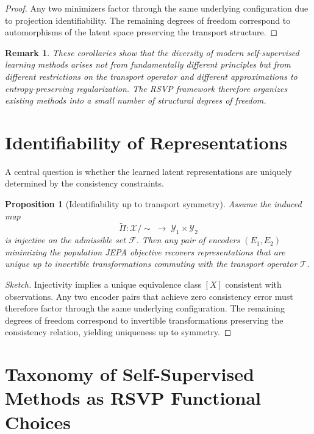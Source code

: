 \documentclass[12pt, oneside]{article}
\newtheorem{proposition}[definition]{Proposition}
\newtheorem{remark}[definition]{Remark}
\begin{document}
\begin{proof}
Any two minimizers factor through the same underlying configuration due to projection identifiability. The remaining degrees of freedom correspond to automorphisms of the latent space preserving the transport structure.
\end{proof}

\begin{remark}
These corollaries show that the diversity of modern self-supervised learning methods arises not from fundamentally different principles but from different restrictions on the transport operator and different approximations to entropy-preserving regularization. The RSVP framework therefore organizes existing methods into a small number of structural degrees of freedom.
\end{remark}

\section{Identifiability of Representations}
\label{sec:identifiability}

A central question is whether the learned latent representations are uniquely determined by the consistency constraints.

\begin{proposition}[Identifiability up to transport symmetry]
Assume the induced map
\[
\widetilde{\Pi} : \mathcal{X} / \sim \;\to\; \mathcal{Y}_1 \times \mathcal{Y}_2
\]
is injective on the admissible set $\mathcal{F}$. Then any pair of encoders $(E_1, E_2)$ minimizing the population JEPA objective recovers representations that are unique up to invertible transformations commuting with the transport operator $\mathcal{T}$.
\end{proposition}

\begin{proof}[Sketch]
Injectivity implies a unique equivalence class $[X]$ consistent with observations. Any two encoder pairs that achieve zero consistency error must therefore factor through the same underlying configuration. The remaining degrees of freedom correspond to invertible transformations preserving the consistency relation, yielding uniqueness up to symmetry.
\end{proof}

\section{Taxonomy of Self-Supervised Methods as RSVP Functional Choices}
\label{sec:taxonomy}
\end{document}

